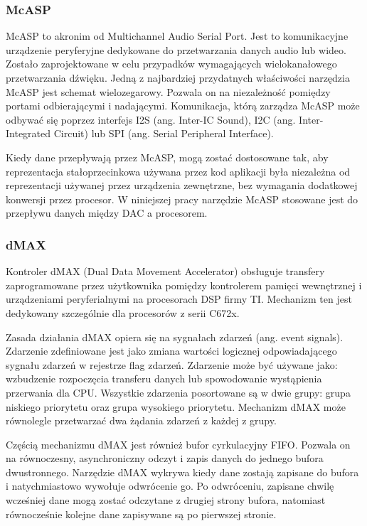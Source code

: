 \subsubsection{McASP}
McASP to akronim od Multichannel Audio Serial Port. Jest to komunikacyjne urządzenie peryferyjne dedykowane do przetwarzania danych audio lub wideo. Zostało zaprojektowane w celu przypadków wymagających wielokanałowego przetwarzania dźwięku. Jedną z najbardziej przydatnych właściwości narzędzia McASP jest schemat wielozegarowy. Pozwala on na niezależność pomiędzy portami odbierającymi i nadającymi. Komunikacja, którą zarządza McASP może odbywać się poprzez interfejs I2S (ang. Inter-IC Sound), I2C (ang. Inter-Integrated Circuit) lub SPI (ang. Serial Peripheral Interface).

Kiedy dane przepływają przez McASP, mogą zostać dostosowane tak, aby reprezentacja stałoprzecinkowa używana przez kod aplikacji była niezależna od reprezentacji używanej przez urządzenia zewnętrzne, bez wymagania dodatkowej konwersji przez procesor.
W niniejszej pracy narzędzie McASP stosowane jest do przepływu danych między DAC a procesorem. 

\subsubsection{dMAX} \label{par:dMax}
Kontroler dMAX (Dual Data Movement Accelerator) obsługuje transfery zaprogramowane przez użytkownika pomiędzy kontrolerem pamięci wewnętrznej i urządzeniami peryferialnymi na procesorach DSP firmy TI. Mechanizm ten jest dedykowany szczególnie dla procesorów z serii C672x.

Zasada działania dMAX opiera się na sygnałach zdarzeń (ang. event signals). Zdarzenie zdefiniowane jest jako zmiana wartości logicznej odpowiadającego sygnału zdarzeń w rejestrze flag zdarzeń. Zdarzenie może być używane jako: wzbudzenie rozpoczęcia transferu danych lub spowodowanie wystąpienia przerwania dla CPU. Wszystkie zdarzenia posortowane są w dwie grupy: grupa niskiego priorytetu oraz grupa wysokiego priorytetu. Mechanizm dMAX może równolegle przetwarzać dwa żądania zdarzeń z każdej z grupy.

Częścią mechanizmu dMAX jest również bufor cyrkulacyjny FIFO. Pozwala on na równoczesny, asynchroniczny odczyt i zapis danych do jednego bufora dwustronnego. Narzędzie dMAX wykrywa kiedy dane zostają zapisane do bufora i natychmiastowo wywołuje odwrócenie go. Po odwróceniu, zapisane chwilę wcześniej dane mogą zostać odczytane z drugiej strony bufora, natomiast równocześnie kolejne dane zapisywane są po pierwszej stronie.

